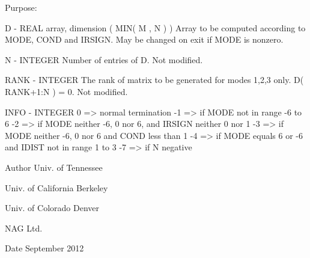 \begin{DoxyParagraph}{Purpose\+: }
\begin{DoxyVerb}
  D      - REAL array, dimension ( MIN( M , N ) )
           Array to be computed according to MODE, COND and IRSIGN.
           May be changed on exit if MODE is nonzero.

  N      - INTEGER
           Number of entries of D. Not modified.

  RANK   - INTEGER
           The rank of matrix to be generated for modes 1,2,3 only.
           D( RANK+1:N ) = 0.
           Not modified.

  INFO   - INTEGER
            0  => normal termination
           -1  => if MODE not in range -6 to 6
           -2  => if MODE neither -6, 0 nor 6, and
                  IRSIGN neither 0 nor 1
           -3  => if MODE neither -6, 0 nor 6 and COND less than 1
           -4  => if MODE equals 6 or -6 and IDIST not in range 1 to 3
           -7  => if N negative\end{DoxyVerb}
 
\end{DoxyParagraph}
\begin{DoxyAuthor}{Author}
Univ. of Tennessee 

Univ. of California Berkeley 

Univ. of Colorado Denver 

N\+A\+G Ltd. 
\end{DoxyAuthor}
\begin{DoxyDate}{Date}
September 2012 
\end{DoxyDate}
\hypertarget{group__real__matgen_gab7855e56a909a6453a7cf0f7078843af}{}
